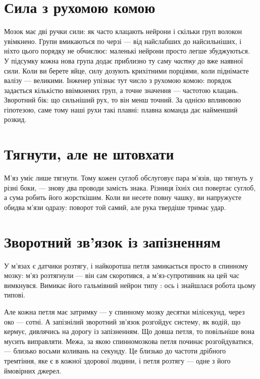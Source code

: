 \section*{Сила з рухомою комою}

Мозок має дві ручки сили: як часто клацають нейрони і скільки груп волокон увімкнено. Групи вмикаються по черзі --- від найслабших до найсильніших, і ніхто цього порядку не обчислює: маленькі нейрони просто легше збуджуються. У підсумку кожна нова група додає приблизно ту саму \emph{частку} до вже наявної сили. Коли ви берете яйце, силу дозують крихітними порціями, коли піднімаєте валізу --- великими. Інженер упізнає тут число з рухомою комою: порядок задається кількістю ввімкнених груп, а точне значення --- частотою клацань. Зворотний бік: що сильніший рух, то він менш точний. За однією впливовою гіпотезою, саме тому наші рухи такі плавні: плавна команда дає найменший розкид.

\section*{Тягнути, але не штовхати}

М'яз уміє лише тягнути. Тому кожен суглоб обслуговує пара м'язів, що тягнуть у різні боки, --- знову два проводи замість знака. Різниця їхніх сил повертає суглоб, а сума робить його жорсткішим. Коли ви несете повну чашку, ви напружуєте обидва м'язи одразу: поворот той самий, але рука твердіше тримає удар.


\section*{Зворотний зв'язок із запізненням}

У м'язах є датчики розтягу, і найкоротша петля замикається просто в спинному мозку: м'яз розтягнули --- він сам скоротився, а м'яз-супротивник на цей час вимкнувся. Вимикає його гальмівний нейрон типу : ось і знайшлася робота цьому типові.

Але кожна петля має затримку --- у спинному мозку десятки мілісекунд, через око --- сотні. А запізнілий зворотний зв'язок розгойдує систему, як водій, що кермує, дивлячись на дорогу із запізненням. Що довша петля, то повільніше вона мусить виправляти. Межа, за якою спинномозкова петля починає розгойдуватися, --- близько восьми коливань на секунду. Це близько до частоти дрібного тремтіння, яке є в кожної здорової людини, і петля розтягу --- одне з його ймовірних джерел.

